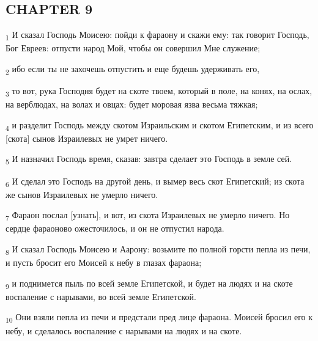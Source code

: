 \subsection{CHAPTER 9}
\begin{tcolorbox}
\textsubscript{1} И сказал Господь Моисею: пойди к фараону и скажи ему: так говорит Господь, Бог Евреев: отпусти народ Мой, чтобы он совершил Мне служение;
\end{tcolorbox}
\begin{tcolorbox}
\textsubscript{2} ибо если ты не захочешь отпустить и еще будешь удерживать его,
\end{tcolorbox}
\begin{tcolorbox}
\textsubscript{3} то вот, рука Господня будет на скоте твоем, который в поле, на конях, на ослах, на верблюдах, на волах и овцах: будет моровая язва весьма тяжкая;
\end{tcolorbox}
\begin{tcolorbox}
\textsubscript{4} и разделит Господь между скотом Израильским и скотом Египетским, и из всего [скота] сынов Израилевых не умрет ничего.
\end{tcolorbox}
\begin{tcolorbox}
\textsubscript{5} И назначил Господь время, сказав: завтра сделает это Господь в земле сей.
\end{tcolorbox}
\begin{tcolorbox}
\textsubscript{6} И сделал это Господь на другой день, и вымер весь скот Египетский; из скота же сынов Израилевых не умерло ничего.
\end{tcolorbox}
\begin{tcolorbox}
\textsubscript{7} Фараон послал [узнать], и вот, из скота Израилевых не умерло ничего. Но сердце фараоново ожесточилось, и он не отпустил народа.
\end{tcolorbox}
\begin{tcolorbox}
\textsubscript{8} И сказал Господь Моисею и Аарону: возьмите по полной горсти пепла из печи, и пусть бросит его Моисей к небу в глазах фараона;
\end{tcolorbox}
\begin{tcolorbox}
\textsubscript{9} и поднимется пыль по всей земле Египетской, и будет на людях и на скоте воспаление с нарывами, во всей земле Египетской.
\end{tcolorbox}
\begin{tcolorbox}
\textsubscript{10} Они взяли пепла из печи и предстали пред лице фараона. Моисей бросил его к небу, и сделалось воспаление с нарывами на людях и на скоте.
\end{tcolorbox}
